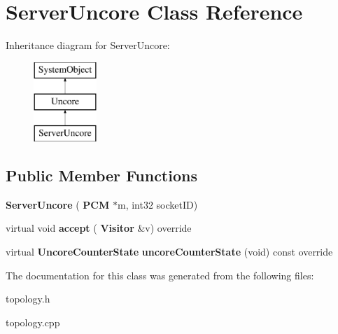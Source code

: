 \section{Server\+Uncore Class Reference}
\label{classServerUncore}
Inheritance diagram for Server\+Uncore\+:\begin{figure}[H]
\begin{center}
\leavevmode
\includegraphics[height=3.000000cm]{classServerUncore}
\end{center}
\end{figure}
\subsection*{Public Member Functions}
\begin{DoxyCompactItemize}
\item 
\mbox{\label{classServerUncore_a113545c2209cb6d239aad31a94746507}} 
{\bfseries Server\+Uncore} (\textbf{ P\+CM} $\ast$m, int32 socket\+ID)
\item 
\mbox{\label{classServerUncore_a0a32e2484bb7e24313e64139f29d0179}} 
virtual void {\bfseries accept} (\textbf{ Visitor} \&v) override
\item 
\mbox{\label{classServerUncore_a6083463b9868a5678a3b69ce0a221d2f}} 
virtual \textbf{ Uncore\+Counter\+State} {\bfseries uncore\+Counter\+State} (void) const override
\end{DoxyCompactItemize}


The documentation for this class was generated from the following files\+:\begin{DoxyCompactItemize}
\item 
topology.\+h\item 
topology.\+cpp\end{DoxyCompactItemize}
